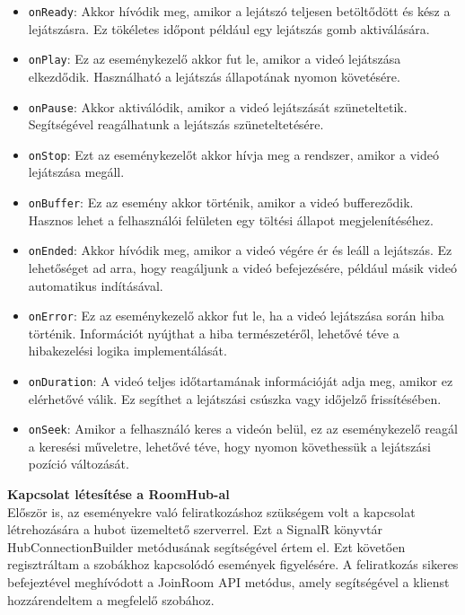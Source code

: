 \begin{itemize}
  \item \texttt{onReady}: Akkor hívódik meg, amikor a lejátszó teljesen betöltődött és kész a lejátszásra. Ez tökéletes időpont például egy lejátszás gomb aktiválására.
  \item \texttt{onPlay}: Ez az eseménykezelő akkor fut le, amikor a videó lejátszása elkezdődik. Használható a lejátszás állapotának nyomon követésére.
  \item \texttt{onPause}: Akkor aktiválódik, amikor a videó lejátszását szüneteltetik. Segítségével reagálhatunk a lejátszás szüneteltetésére.
  \item \texttt{onStop}: Ezt az eseménykezelőt akkor hívja meg a rendszer, amikor a videó lejátszása megáll.
  \item \texttt{onBuffer}: Ez az esemény akkor történik, amikor a videó buffereződik. Hasznos lehet a felhasználói felületen egy töltési állapot megjelenítéséhez.
  \item \texttt{onEnded}: Akkor hívódik meg, amikor a videó végére ér és leáll a lejátszás. Ez lehetőséget ad arra, hogy reagáljunk a videó befejezésére, például másik videó automatikus indításával.
  \item \texttt{onError}: Ez az eseménykezelő akkor fut le, ha a videó lejátszása során hiba történik. Információt nyújthat a hiba természetéről, lehetővé téve a hibakezelési logika implementálását.
  \item \texttt{onDuration}: A videó teljes időtartamának információját adja meg, amikor ez elérhetővé válik. Ez segíthet a lejátszási csúszka vagy időjelző frissítésében.
  \item \texttt{onSeek}: Amikor a felhasználó keres a videón belül, ez az eseménykezelő reagál a keresési műveletre, lehetővé téve, hogy nyomon követhessük a lejátszási pozíció változását.
\end{itemize}
\vspace{0em}
\textbf{Kapcsolat létesítése a RoomHub-al}
\\
Először is, az eseményekre való feliratkozáshoz szükségem volt a kapcsolat létrehozására a hubot üzemeltető szerverrel. Ezt a SignalR könyvtár HubConnectionBuilder metódusának segítségével értem el. Ezt követően regisztráltam a szobákhoz kapcsolódó események figyelésére. A feliratkozás sikeres befejeztével meghívódott a JoinRoom API metódus, amely segítségével a klienst hozzárendeltem a megfelelő szobához.
